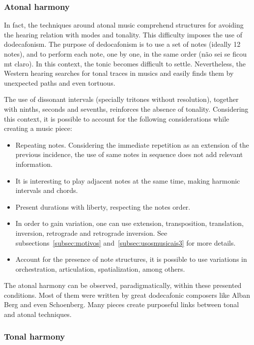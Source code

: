 \documentclass[
 aip,
 jmp,
 amsmath,amssymb,
 reprint,
]{revtex4-1}
\begin{document}
\subsubsection{Atonal harmony}

In fact, the techniques around atonal music comprehend structures for avoiding
the hearing relation with modes and tonality. This difficulty imposes the use of dodecafonism. 
The purpose of dedocafonism is to use a set of notes (ideally 12 notes), and to perform each note, one by one, in the same
order (não sei se ficou mt claro). In this context, the tonic becomes difficult to settle. Nevertheless, the
Western hearing searches for tonal traces in musics and easily finds them by
unexpected paths and even tortuous.


The use of dissonant intervals (specially tritones without resolution), together
with ninths, seconds and sevenths, reinforces the absence of tonality. Considering
this context, it is possible to account for the following considerations while creating a music
piece:

\begin{itemize}
     \item Repeating notes. Considering the immediate repetition as an extension
     of the previous incidence, the use of same notes in sequence does not add relevant information.
     \item It is interesting to play adjacent notes at the same time, making harmonic intervals
     and chords.
     \item Present durations with liberty, respecting the notes order.
     \item In order to gain variation, one can use extension, transposition, translation, inversion, retrograde and retrograde inversion. See subsections~\ref{subsec:motivos}
     and~\ref{subsec:usosmusicais3} for more details.
     \item Account for the presence of note structures, it is possible to use variations in orchestration, articulation, spatialization, among others.
\end{itemize}

The atonal harmony can be observed, paradigmatically, within these presented
conditions. Most of them were written by great dodecafonic composers like Alban Berg and even Schoenberg. Many pieces create purposeful links between tonal and atonal techniques.

\subsubsection{Tonal harmony}
\end{document}
